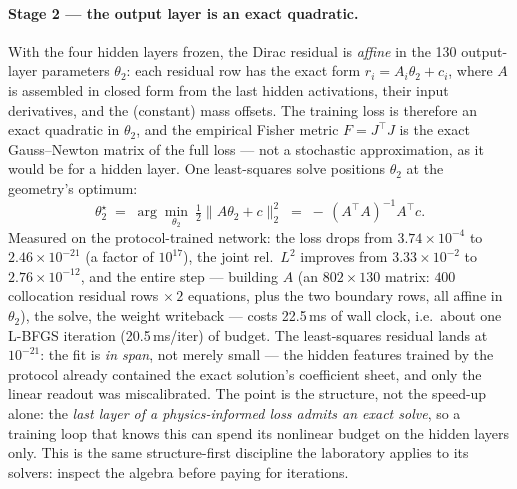 \documentclass[11pt,a4paper]{article}
\theoremstyle{plain}
\theoremstyle{definition}
\begin{document}
\paragraph{Stage 2 --- the output layer is an exact quadratic.}
With the four hidden layers frozen, the Dirac residual is \emph{affine} in
the 130 output-layer parameters $\theta_2$: each residual row has the exact
form $r_i = A_i\theta_2 + c_i$, where $A$ is assembled in closed form from
the last hidden activations, their input derivatives, and the (constant)
mass offsets. The training loss is therefore an exact quadratic in
$\theta_2$, and the empirical Fisher metric $F=J^{\!\top}\!J$ is the exact
Gauss--Newton matrix of the full loss --- not a stochastic approximation, as
it would be for a hidden layer. One least-squares solve positions
$\theta_2$ at the geometry's optimum:
\begin{equation}
  \theta_2^\star \;=\; \arg\min_{\theta_2}\ \tfrac12\|A\theta_2+c\|_2^2
  \;=\; -\,(A^{\!\top}A)^{-1}A^{\!\top}c .
\end{equation}
Measured on the protocol-trained network: the loss drops from
$3.74\times10^{-4}$ to $2.46\times10^{-21}$ (a factor of
$10^{17}$), the joint rel.\ $L^2$ improves from $3.33\times10^{-2}$ to
$2.76\times10^{-12}$, and the entire step --- building $A$
(an $802\times130$ matrix: $400$ collocation residual rows
$\times\,2$ equations, plus the two boundary rows, all affine in
$\theta_2$), the solve, the weight writeback ---
costs 22.5\,ms of wall clock, i.e.\ about one L-BFGS iteration
(20.5\,ms/iter) of budget.  The least-squares residual lands at
$10^{-21}$: the fit is \emph{in span}, not merely small --- the hidden
features trained by the protocol already contained the exact solution's
coefficient sheet, and only the linear readout was miscalibrated.  The
point is the structure, not the speed-up alone: the \emph{last layer of a
physics-informed loss admits an exact solve}, so a training loop that
knows this can spend its nonlinear budget on the hidden layers only.
This is the same structure-first discipline the laboratory applies to its
solvers: inspect the algebra before paying for iterations.
\end{document}
